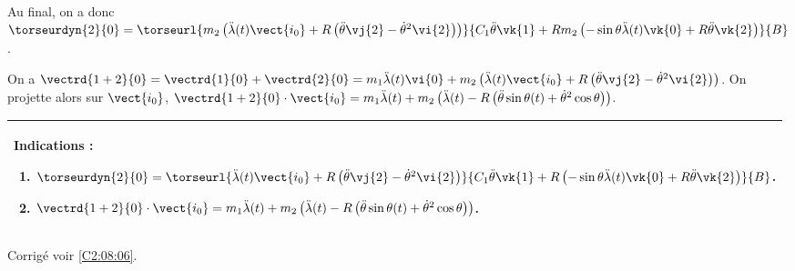 Au final, on a donc $\torseurdyn{2}{0}=\torseurl{%
m_2\left(\ddot{\lambda}(t) \vect{i_0} + R \left(\ddot{\theta} \vj{2} - \dot{\theta}^2 \vi{2}\right)\right)
}{%
C_1  \ddot{\theta} \vk{1} + Rm_2\left( -\sin \theta \ddot{\lambda}(t) \vk{0} + R \ddot{\theta} \vk{2}\right)
}{B}$.
\else
\fi

\ifprof

On a $\vectrd{1+2}{0}=\vectrd{1}{0}+\vectrd{2}{0}=m_1\ddot{\lambda}(t)\vi{0}+m_2\left(\ddot{\lambda}(t) \vect{i_0} + R \left(\ddot{\theta} \vj{2} - \dot{\theta}^2 \vi{2}\right)\right)$.
On projette alors sur $\vect{i_0}$,
$\vectrd{1+2}{0}\cdot \vect{i_0} =m_1\ddot{\lambda}(t)+m_2\left(\ddot{\lambda}(t)-R \left(\ddot{\theta} \sin\theta(t)  + \dot{\theta}^2 \cos\theta \right)\right) $.
\else
\fi


\ifcolle
\else
\fi


\ifprof
\else
\ifcolle
\else
\footnotesize
\begin{center}
\begin{tabular}{|p{.9\linewidth}|}
\hline
Indications :
\begin{enumerate}
\item $\torseurdyn{2}{0}=\torseurl{\ddot{\lambda}(t) \vect{i_0} + R \left(\ddot{\theta} \vj{2} - \dot{\theta}^2 \vi{2}\right)}{C_1  \ddot{\theta} \vk{1} + R\left( -\sin \theta \ddot{\lambda}(t) \vk{0} + R \ddot{\theta} \vk{2}\right)}{B}$.
\item $\vectrd{1+2}{0}\cdot \vect{i_0}=m_1\ddot{\lambda}(t)+m_2\left(\ddot{\lambda}(t)- R \left(\ddot{\theta} \sin\theta(t)  + \dot{\theta}^2 \cos\theta \right)\right)$. 
\end{enumerate} \\ \hline
\end{tabular}
\end{center}
\normalsize
\fi
\begin{flushright}
\footnotesize{Corrigé  voir \ref{C2:08:06}.}
\end{flushright}%
\fi